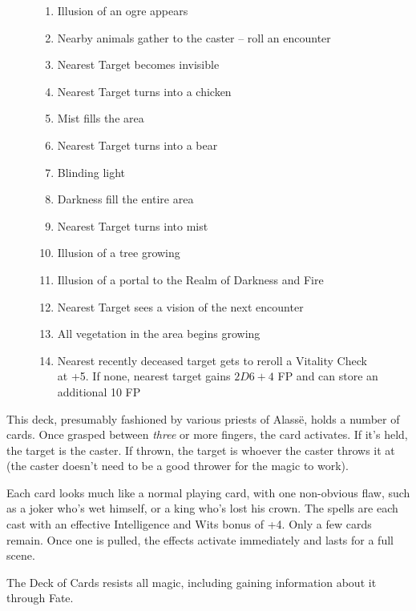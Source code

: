 \begin{multicols}{2}
\begin{figure*}[t!]
\begin{tcolorbox}
	\begin{multicols}{2}
	\begin{enumerate}
		\item{Illusion of an ogre appears}
		\item{Nearby animals gather to the caster -- roll an encounter}
		\item{Nearest Target becomes invisible}
		\item{Nearest Target turns into a chicken}
		\item{Mist fills the area}
		\item{Nearest Target turns into a bear}
		\item{Blinding light}
		\item{Darkness fill the entire area}
		\item{Nearest Target turns into mist}
		\item{Illusion of a tree growing}
		\item{Illusion of a portal to the Realm of Darkness and Fire}
		\item{Nearest Target sees a vision of the next encounter}
		\item{All vegetation in the area begins growing}
		\item{Nearest recently deceased target gets to reroll a Vitality Check at +5.  If none, nearest target gains $2D6+4$ FP and can store an additional 10 FP}
	\end{enumerate}
	\end{multicols}
\end{tcolorbox}
\end{figure*}

This deck, presumably fashioned by various priests of Alass\"{e}, holds a number of cards.
Once grasped between \emph{three} or more fingers, the card activates.
If it's held, the target is the caster.
If thrown, the target is whoever the caster throws it at (the caster doesn't need to be a good thrower for the magic to work).

Each card looks much like a normal playing card, with one non-obvious flaw, such as a joker who's wet himself, or a king who's lost his crown.  The spells are each cast with an effective Intelligence and Wits bonus of +4.  Only a few cards remain.  Once one is pulled, the effects activate immediately and lasts for a full scene.

The Deck of Cards resists all magic, including gaining information about it through Fate.


\end{multicols}
